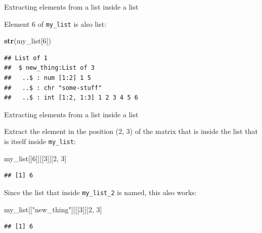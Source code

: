 \documentclass[ignorenonframetext,]{beamer}
\newenvironment{Shaded}{\begin{snugshade}}{\end{snugshade}}
\newcommand{\DecValTok}[1]{\textcolor[rgb]{0.00,0.00,0.81}{#1}}
\newcommand{\KeywordTok}[1]{\textcolor[rgb]{0.13,0.29,0.53}{\textbf{#1}}}
\newcommand{\NormalTok}[1]{#1}
\newcommand{\StringTok}[1]{\textcolor[rgb]{0.31,0.60,0.02}{#1}}
\begin{document}
\begin{frame}[fragile]{Extracting elements from a list inside a list}
\protect\hypertarget{extracting-elements-from-a-list-inside-a-list}{}

Element 6 of \texttt{my\_list} is also list:

\begin{Shaded}
\begin{Highlighting}[]
\KeywordTok{str}\NormalTok{(my_list[}\DecValTok{6}\NormalTok{])}
\end{Highlighting}
\end{Shaded}

\begin{verbatim}
## List of 1
##  $ new_thing:List of 3
##   ..$ : num [1:2] 1 5
##   ..$ : chr "some-stuff"
##   ..$ : int [1:2, 1:3] 1 2 3 4 5 6
\end{verbatim}

\end{frame}

\begin{frame}[fragile]{Extracting elements from a list inside a list}
\protect\hypertarget{extracting-elements-from-a-list-inside-a-list-1}{}

Extract the element in the position (2, 3) of the matrix that is inside
the list that is itself inside \texttt{my\_list}:

\begin{Shaded}
\begin{Highlighting}[]
\NormalTok{my_list[[}\DecValTok{6}\NormalTok{]][[}\DecValTok{3}\NormalTok{]][}\DecValTok{2}\NormalTok{, }\DecValTok{3}\NormalTok{]}
\end{Highlighting}
\end{Shaded}

\begin{verbatim}
## [1] 6
\end{verbatim}

Since the list that inside \texttt{my\_list\_2} is named, this also
works:

\begin{Shaded}
\begin{Highlighting}[]
\NormalTok{my_list[[}\StringTok{"new_thing"}\NormalTok{]][[}\DecValTok{3}\NormalTok{]][}\DecValTok{2}\NormalTok{, }\DecValTok{3}\NormalTok{]}
\end{Highlighting}
\end{Shaded}

\begin{verbatim}
## [1] 6
\end{verbatim}

\end{frame}
\end{document}
